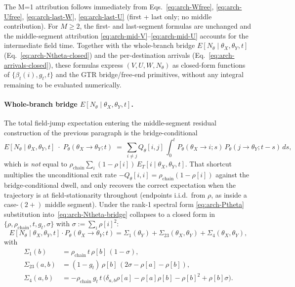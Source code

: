 The M{=}1 attribution follows immediately from
Eqs.~\ref{eq:arch-Wfree}, \ref{eq:arch-Ufree}, \ref{eq:arch-last-W},
\ref{eq:arch-last-U} (first + last only; no middle contribution). For
$M \geq 2$, the first- and last-segment formulas are unchanged and
the middle-segment attribution
\eqref{eq:arch-mid-V}--\eqref{eq:arch-mid-U} accounts for the
intermediate field time. Together with the whole-branch bridge
$E[N_\theta \mid \theta_X, \theta_Y, t]$
(Eq.~\ref{eq:arch-Ntheta-closed}) and the per-destination arrivals
(Eq.~\ref{eq:arch-arrivals-closed}), these formulas express
$(V, U, W, N_\theta)$ as closed-form functions of
$\{\beta_t(i), g_t, t\}$ and the GTR bridge/free-end primitives,
without any integral remaining to be evaluated numerically.

\paragraph{Whole-branch bridge $E[N_\theta \mid \theta_X, \theta_Y, t]$.}
The total field-jump expectation entering the middle-segment residual
construction of the previous paragraph is the bridge-conditional
\begin{equation}
  E[N_\theta \mid \theta_X, \theta_Y, t] \;\cdot\; P_\theta(\theta_X \to \theta_Y; t)
    \;=\; \sum_{i \ne j} Q_\theta[i, j]\,
      \int_0^t P_\theta(\theta_X \to i; s)\,
              P_\theta(j \to \theta_Y; t{-}s)\, ds,
  \label{eq:arch-Ntheta-bridge}
\end{equation}
which is \emph{not} equal to
$\rho_{\text{chain}} \sum_i (1 - \rho[i])\, E_T[i \mid \theta_X, \theta_Y, t]$.
That shortcut multiplies the unconditional exit rate $-Q_\theta[i,i] =
\rho_{\text{chain}} (1 - \rho[i])$ against the bridge-conditional dwell,
and only recovers the correct expectation when the trajectory is at
field-stationarity throughout (endpoints i.i.d.\ from $\rho$, as inside a
case-$(2+)$ middle segment). Under the rank-1 spectral form
\eqref{eq:arch-Ptheta} substitution into~\eqref{eq:arch-Ntheta-bridge}
collapses to a closed form in $\{\rho, \rho_{\text{chain}}, t, g_t,
\sigma\}$ with $\sigma := \sum_i \rho[i]^2$:
\begin{equation}
  E[N_\theta \mid \theta_X, \theta_Y, t] \cdot P_\theta(\theta_X \to \theta_Y; t)
    = \Sigma_1(\theta_Y) + \Sigma_{23}(\theta_X, \theta_Y) + \Sigma_4(\theta_X, \theta_Y),
  \label{eq:arch-Ntheta-closed}
\end{equation}
with
\begin{align}
  \Sigma_1(b)    &= \rho_{\text{chain}}\,t\,\rho[b]\,(1 - \sigma), \\
  \Sigma_{23}(a, b) &= (1 - g_t)\, \rho[b]\, (2\sigma - \rho[a] - \rho[b]), \\
  \Sigma_4(a, b) &= -\rho_{\text{chain}}\, g_t\, t\,
    \bigl(\delta_{a, b}\rho[a] - \rho[a]\rho[b] - \rho[b]^2 + \rho[b]\sigma\bigr).
\end{align}
